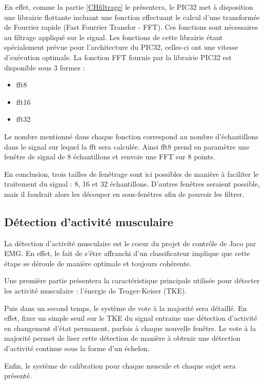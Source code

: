 \documentclass[letterpaper, twoside, 12pt, memoire, creativecommons, hyperref]{thETS}
\begin{document}
En effet, comme la partie \ref{CHfiltrage} le présentera, le PIC32 met à disposition une librairie flottante incluant une fonction effectuant le calcul d'une transformée de Fourrier rapide (Fast Fourrier Transfor - FFT). Ces fonctions sont nécessaires au filtrage appliqué sur le signal. Les fonctions de cette librairie étant spécialement prévue pour l'architecture du PIC32, celles-ci ont une vitesse d'exécution optimale. La fonction FFT fournie par la librairie PIC32 est disponible sous 3 formes : 

\begin{itemize}
 \item fft8
 \item fft16
 \item fft32
\end{itemize}

Le nombre mentionné dans chaque fonction correspond au nombre d'échantillons dans le signal sur lequel la fft sera calculée. Ainsi fft8 prend en paramètre une fenêtre de signal de 8 échantillons et renvoie une FFT sur 8 points.

En conclusion, trois tailles de fenêtrage sont ici possibles de manière à faciliter le traitement du signal : 8, 16 et 32 échantillons. D'autres fenêtres seraient possible, mais il faudrait alors les découper en sous-fenêtres afin de pouvoir les filtrer. 

\subsection{Détection d'activité musculaire}\label{CHdetect}

La détection d'activité musculaire est le coeur du projet de contrôle de Jaco par EMG. En effet, le fait de s'être affranchi d'un classificateur implique que cette étape se déroule de manière optimale et toujours cohérente.

Une première partie présentera la caractéristique principale utilisée pour détecter les activité musculaire : l'énergie de Teager-Keiser (TKE). 

Puis dans un second temps, le système de vote à la majorité sera détaillé. En effet, fixer un simple seuil sur le TKE du signal entraine une détection d'activité en changement d'état permanent, parfois à chaque nouvelle fenêtre. Le vote à la majorité permet de liser cette détection de manière à obtenir une détection d'activité continue sous la forme d'un échelon.

Enfin, le système de calibration pour chaque muscule et chaque sujet sera présenté.
\end{document}
